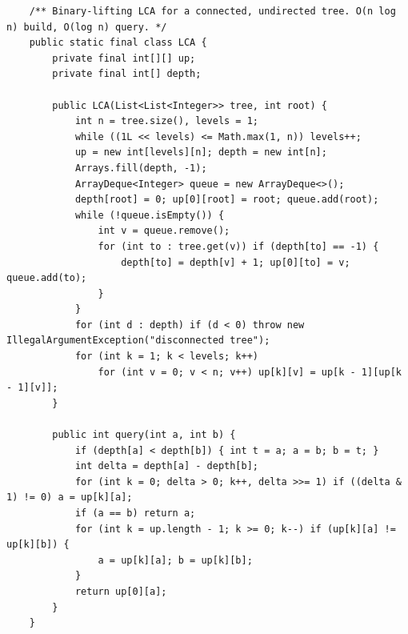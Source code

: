 \documentclass[10pt,letterpaper]{article}
\begin{document}
\begin{lstlisting}
    /** Binary-lifting LCA for a connected, undirected tree. O(n log n) build, O(log n) query. */
    public static final class LCA {
        private final int[][] up;
        private final int[] depth;

        public LCA(List<List<Integer>> tree, int root) {
            int n = tree.size(), levels = 1;
            while ((1L << levels) <= Math.max(1, n)) levels++;
            up = new int[levels][n]; depth = new int[n];
            Arrays.fill(depth, -1);
            ArrayDeque<Integer> queue = new ArrayDeque<>();
            depth[root] = 0; up[0][root] = root; queue.add(root);
            while (!queue.isEmpty()) {
                int v = queue.remove();
                for (int to : tree.get(v)) if (depth[to] == -1) {
                    depth[to] = depth[v] + 1; up[0][to] = v; queue.add(to);
                }
            }
            for (int d : depth) if (d < 0) throw new IllegalArgumentException("disconnected tree");
            for (int k = 1; k < levels; k++)
                for (int v = 0; v < n; v++) up[k][v] = up[k - 1][up[k - 1][v]];
        }

        public int query(int a, int b) {
            if (depth[a] < depth[b]) { int t = a; a = b; b = t; }
            int delta = depth[a] - depth[b];
            for (int k = 0; delta > 0; k++, delta >>= 1) if ((delta & 1) != 0) a = up[k][a];
            if (a == b) return a;
            for (int k = up.length - 1; k >= 0; k--) if (up[k][a] != up[k][b]) {
                a = up[k][a]; b = up[k][b];
            }
            return up[0][a];
        }
    }


\end{lstlisting}
\end{document}
